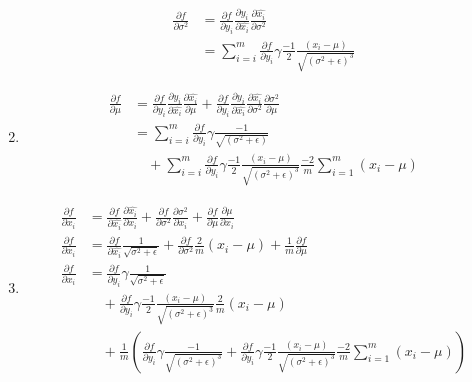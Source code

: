 \documentclass{article}
\begin{document}
\begin{enumerate}[label=\alph*.]
\begin{equation*}
\begin{aligned}
            \frac{\partial f}{\partial \sigma^2} &= \frac{\partial f}{\partial y_i} \frac{\partial y_i}{\partial \widehat{x_i}} \frac{\partial \widehat{x_i}}{\partial \sigma^2} \\
            &=  \sum_{i=i}^{m}\frac{\partial f}{\partial y_i} \gamma \frac{-1}{2} \frac{(x_i-\mu)}{\sqrt{(\sigma^2 + \epsilon)^3}}
        \end{aligned}
    \end{equation*}  
    \item 
    \begin{equation*}
        \begin{aligned}
            \frac{\partial f}{\partial \mu} &= \frac{\partial f}{\partial y_i} \frac{\partial y_i}{\partial \widehat{x_i}} \frac{\partial \widehat{x_i}}{\partial \mu} + \frac{\partial f}{\partial y_i} \frac{\partial y_i}{\partial \widehat{x_i}} \frac{\partial \widehat{x_i}}{\partial \sigma^2} \frac{\partial \sigma^2}{\partial \mu} \\
            &= \sum_{i=i}^{m}\frac{\partial f}{\partial y_i} \gamma \frac{-1}{\sqrt{(\sigma^2+\epsilon)}} \\
            &\quad+ \sum_{i=i}^{m}\frac{\partial f}{\partial y_i} \gamma \frac{-1}{2} \frac{(x_i-\mu)}{\sqrt{(\sigma^2 + \epsilon)^3}} \frac{-2}{m} \sum_{i=1}^{m}(x_i - \mu) 
        \end{aligned}
    \end{equation*}  
    \item
    \begin{equation*}
        \begin{aligned}
            \frac{\partial f}{\partial x_i} &= \frac{\partial f}{\partial \widehat{x_i}} \frac{\partial \widehat{x_i}}{\partial x_i} + \frac{\partial f}{\partial \sigma^2} \frac{\partial \sigma^2}{\partial x_i} + \frac{\partial f}{\partial \mu} \frac{\partial \mu}{\partial x_i} \\
            \frac{\partial f}{\partial x_i} &= \frac{\partial f}{\partial \widehat{x_i}}\frac{1}{\sqrt{\sigma^2+\epsilon}} + \frac{\partial f}{\partial \sigma^2}\frac{2}{m}(x_i-\mu) + \frac{1}{m}\frac{\partial f}{\partial \mu}\\
            \frac{\partial f}{\partial x_i} &= \frac{\partial f}{\partial y_i} \gamma \frac{1}{\sqrt{\sigma^2+\epsilon}} \\
            &\quad+ \frac{\partial f}{\partial y_i} \gamma \frac{-1}{2} \frac{(x_i-\mu)}{\sqrt{(\sigma^2 + \epsilon)^3}} \frac{2}{m}(x_i-\mu) \\
            &\quad+ \frac{1}{m}(\frac{\partial f}{\partial y_i} \gamma \frac{-1}{\sqrt{(\sigma^2+\epsilon)^3}} + \frac{\partial f}{\partial y_i} \gamma \frac{-1}{2} \frac{(x_i-\mu)}{\sqrt{(\sigma^2 + \epsilon)^3}} \frac{-2}{m} \sum_{i=1}^{m}(x_i - \mu) )
        \end{aligned}
    \end{equation*}
\end{enumerate}
\end{document}
